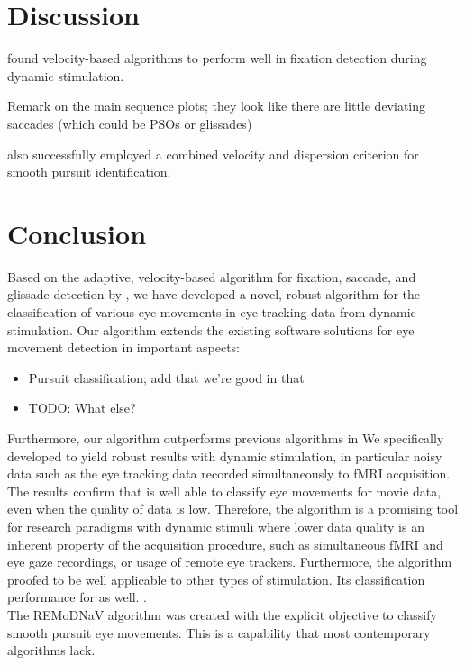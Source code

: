 \section*{Discussion}\label{dis}
\cite{munn2008fixation} found velocity-based algorithms to perform well in fixation detection during dynamic stimulation.

Remark on the main sequence plots; they look like there are little deviating saccades (which could be PSOs or glissades)

\cite{Komogortsev2013} also successfully employed a combined velocity and dispersion criterion for smooth pursuit identification.

\section*{Conclusion}\label{con} %

Based on the adaptive, velocity-based algorithm for fixation, saccade, and
glissade detection by \cite{Nystrom2010AnData}, we have developed a novel,
robust algorithm for the classification of various eye movements in eye tracking
data from dynamic stimulation. Our algorithm extends the existing software solutions
for eye movement detection in important aspects:
\begin{itemize}
	\item Pursuit classification; add that we're good in that
	\item TODO: What else?
\end{itemize}

Furthermore, our algorithm outperforms previous algorithms in
We specifically developed \remodnav to yield robust results with dynamic stimulation,
in particular noisy data such as the eye tracking data recorded simultaneously to fMRI acquisition.
The results confirm that \remodnav is well able to classify eye movements for
movie data, even when the quality of data is low. Therefore, the algorithm is a promising tool for research paradigms with dynamic stimuli where lower data quality is an inherent property of the acquisition procedure, such as simultaneous fMRI and eye gaze recordings, or usage of remote eye trackers.
Furthermore, the algorithm proofed to be well applicable to other types of stimulation. Its classification performance for
as well. .\\
The REMoDNaV algorithm was created with the explicit objective to classify smooth
pursuit eye movements. This is a capability that most contemporary algorithms lack.

